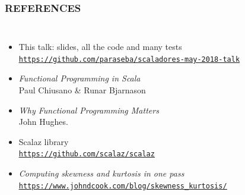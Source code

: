 \documentclass{beamer}
\begin{document}
\begin{frame} \frametitle{REFERENCES}
  \begin{columns}[c]
      \begin{itemize}

        \item This talk: slides, all the \alert{code and many tests} \\
          \href{https://github.com/paraseba/scaladores-may-2018-talk}{\scriptsize \underline{\texttt{https://github.com/paraseba/scaladores-may-2018-talk}}}

        \item \textit{Functional Programming in Scala}\\ Paul Chiusano \& Runar Bjarnason

        \item \textit{Why Functional Programming Matters} \\
          John Hughes.

        \item Scalaz library \\
          {\href{https://github.com/scalaz/scalaz}{\scriptsize\underline{\texttt{https://github.com/scalaz/scalaz}}}}

        \item \textit{Computing skewness and kurtosis in one pass} \\
          {\footnotesize
            \href{https://www.johndcook.com/blog/skewness\_kurtosis/}{\scriptsize\underline{\texttt{https://www.johndcook.com/blog/skewness\_kurtosis/}}}}
      \end{itemize}



\end{columns}
\end{frame}
\end{document}
